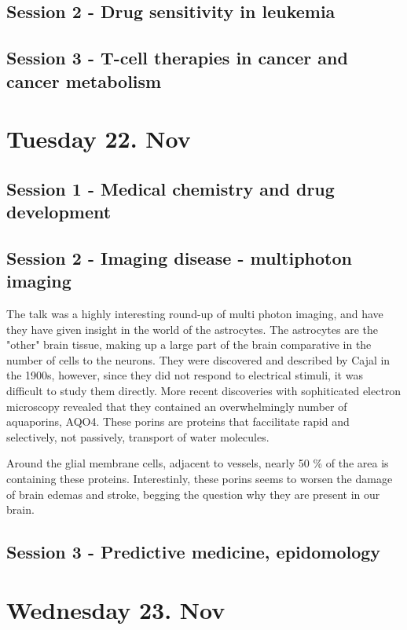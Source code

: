 \documentclass[12p]{article}
\begin{document}
\subsection*{Session 2 - Drug sensitivity in leukemia}

\subsection*{Session 3 - T-cell therapies in cancer and cancer metabolism}

\section*{Tuesday 22. Nov}
\subsection*{Session 1 - Medical chemistry and drug development}
\subsection*{Session 2 - Imaging disease - multiphoton imaging}

The talk was a highly interesting round-up of multi photon imaging, and have they have given insight in the world of the astrocytes.
The astrocytes are the "other" brain tissue, making up a large part of the brain comparative in the number of cells to the neurons.
They were discovered and described by Cajal in the 1900s, however, since they did not respond to electrical stimuli, it was difficult to study them directly.
More recent discoveries with sophiticated electron microscopy revealed that they contained an overwhelmingly number of aquaporins, AQO4.
These porins are proteins that faccilitate rapid and selectively, not passively, transport of water molecules.

Around the glial membrane cells, adjacent to vessels, nearly 50 \% of the area is containing these proteins.
Interestinly, these porins seems to worsen the damage of brain edemas and stroke, begging the question why they are present in our brain.




\subsection*{Session 3 - Predictive medicine, epidomology}
\section*{Wednesday 23. Nov}
\end{document}
